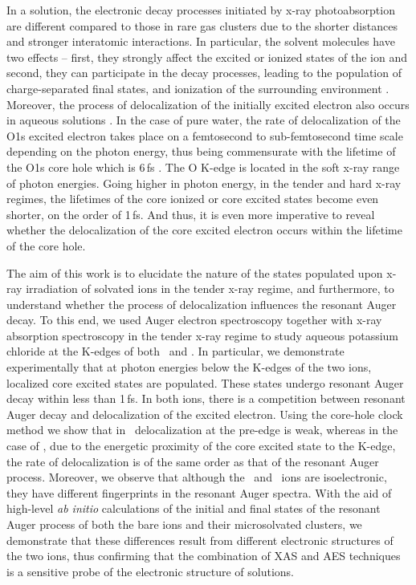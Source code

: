 In a solution, the electronic decay processes initiated by x-ray photoabsorption are different compared to those in rare gas clusters due to the shorter distances and stronger interatomic interactions. In particular, the solvent molecules have two effects -- first, they strongly affect the excited \citep{miteva16:16671} or ionized states of the ion and second, they can participate in the decay processes, leading to the population of charge-separated final states, and ionization of the surrounding environment \citep{Pokapanich09:7264,Pokapanich11:13430,Stumpf16:237,ceolin17:263003}. Moreover, the process of delocalization of the initially excited electron also occurs in aqueous solutions \citep{Nordlund07:217406,Ottosson11:13489}.
In the case of pure water, the rate of delocalization of the O1s excited electron takes place on a femtosecond to sub-femtosecond time scale depending on the photon energy, thus being commensurate with the lifetime of the O1s core hole which is 6\,fs \citep{Nordlund07:217406}. The O K-edge is located in the soft x-ray range of photon energies. Going higher in photon energy, in the tender and hard x-ray regimes, the lifetimes of the core ionized or core excited states become even shorter, on the order of 1\,fs. And thus, it is even more imperative to reveal whether the delocalization of the core excited electron occurs within the lifetime of the core hole.


The aim of this work is to elucidate the nature of the states populated upon x-ray irradiation of solvated ions in the tender x-ray regime, and furthermore, to understand whether the process of delocalization influences the resonant Auger decay. To this end, we used Auger electron spectroscopy together with x-ray absorption spectroscopy in the tender x-ray regime to study aqueous potassium chloride at the K-edges of both \ki~and \cli. In particular, we demonstrate experimentally that at photon energies below the K-edges of the two ions, localized core excited states are populated. These states undergo resonant Auger decay within less than 1\,fs. In both ions, there is a competition between resonant Auger decay and delocalization of the excited electron. Using the core-hole clock method we show that in \ki~delocalization at the pre-edge is weak, whereas in the case of \cli, due to the energetic proximity of the core excited state to the K-edge, the rate of delocalization is of the same order as that of the resonant Auger process. Moreover, we observe that although the \ki~and \cli~ions are isoelectronic, they have different fingerprints in the resonant Auger spectra. With the aid of high-level {\it ab initio} calculations of the initial and final states of the resonant Auger process of both the bare ions and their microsolvated clusters, we demonstrate that these differences result from different electronic structures of the two ions, thus confirming that the combination of XAS and AES techniques is a sensitive probe of the electronic structure of solutions.


